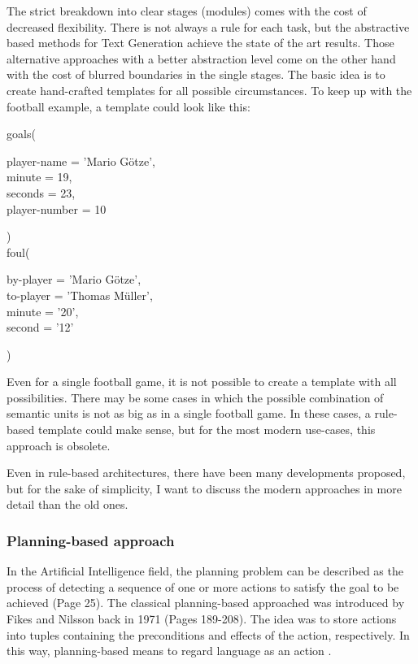 The strict breakdown into clear stages (modules) comes with the cost of decreased flexibility. There is not always a rule for each task, but the abstractive based methods for Text Generation achieve the state of the art results. Those alternative approaches with a better abstraction level come on the other hand with the cost of blurred boundaries in the single stages. The basic idea is to create hand-crafted templates for all possible circumstances. To keep up with the football example, a template could look like this:

\begin{tcolorbox}
	goals(
	\begin{addmargin}[1cm]{1cm}
		player-name = 'Mario Götze',\\
		minute = 19,\\
		seconds = 23,\\
		player-number = 10
	\end{addmargin}
	
	)\\
	
	foul(
	\begin{addmargin}[1cm]{1cm}
		by-player = 'Mario Götze',\\
		to-player = 'Thomas Müller',\\
		minute = '20',\\
		second = '12'
	\end{addmargin}
	)
\end{tcolorbox}

Even for a single football game, it is not possible to create a template with all possibilities. There may be some cases in which the possible combination of semantic units is not as big as in a single football game. In these cases, a rule-based template could make sense, but for the most modern use-cases, this approach is obsolete.

Even in rule-based architectures, there have been many developments proposed, but for the sake of simplicity, I want to discuss the modern approaches in more detail than the old ones.

\subsubsection{Planning-based approach}

In the Artificial Intelligence field, the planning problem can be described as the process of detecting a sequence of one or more actions to satisfy the goal to be achieved \cite{gatt} (Page 25). The classical planning-based approached was introduced by Fikes and Nilsson back in 1971 \cite{Fikes:71} (Pages 189-208). The idea was to store actions into tuples containing the preconditions and effects of the action, respectively. In this way, planning-based means to regard language as an action \cite{clark}. 

